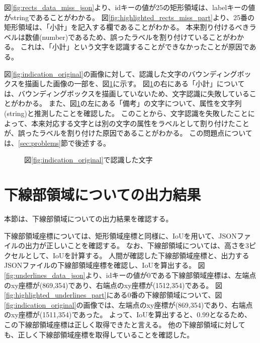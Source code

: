 図\ref{fig:rects_data_miss_json}より、idキーの値が25の矩形領域は、labelキーの値がstringであることがわかる。
図\ref{fig:highlighted_rects_miss_part}より、25番の矩形領域は、「小計」を記入する欄であることがわかる。
本来割り付けるべきラベルは数値(number)であるため、誤ったラベルを割り付けていることがわかる。
これは、「小計」という文字を認識することができなかったことが原因である。

図\ref{fig:indication_original}の画像に対して、認識した文字のバウンディングボックスを描画した画像の一部を、図\ref{fig:OCR_result}に示す。
図\ref{fig:OCR_result}の右にある「小計」については、バウンディングボックスを描画していないため、文字認識に失敗していることがわかる。
また、図\ref{fig:OCR_result}の左にある「備考」の文字について、属性を文字列(string)と推測したことを確認した。
このことから、文字認識を失敗したことによって、本来対応する文字とは別の文字の属性をラベルとして割り付けたことが、誤ったラベルを割り付けた原因であることがわかる。
この問題点については、\ref{sec:problems}節で後述する。

\begin{figure}[t]
    \begin{center}
        \caption{図\ref{fig:indication_original}で認識した文字}
        \label{fig:OCR_result}
    \end{center}
\end{figure}

\section{下線部領域についての出力結果}\label{sec:result_underline}
本節は、下線部領域についての出力結果を確認する。

下線部領域座標については、矩形領域座標と同様に、IoUを用いて、JSONファイルの出力が正しいことを確認する。
なお、下線部領域については、高さを3ピクセルとして、IoUを計算する。
人間が確認した下線部領域座標と、出力するJSONファイルの下線部領域座標を確認し、IoUを算出する。
図\ref{fig:underlines_data_json}より、idキーの値が0である下線部領域座標は、左端点のxy座標が(869,354)であり、右端点のxy座標が(1512,354)である。
図\ref{fig:highlighted_underlines_part}にある0番の下線部領域について、図\ref{fig:indication_original}の画像では、左端点のxy座標が(869,354)であり、右端点のxy座標が(1511,354)であった。
よって、IoUを算出すると、0.99となるため、この下線部領域座標は正しく取得できたと言える。
他の下線部領域に対しても、正しく下線部領域座標を取得していることを確認した。

